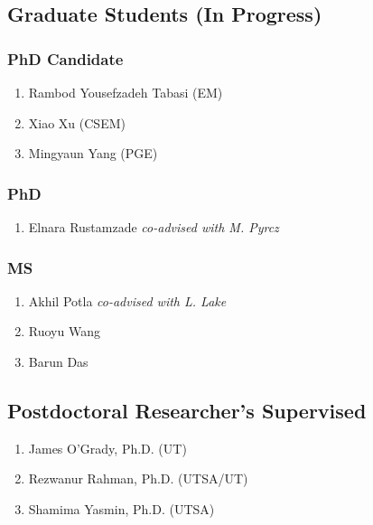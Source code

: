 \subsection*{Graduate Students (In Progress)}

\subsubsection*{PhD Candidate}
\begin{enumerate}
    \item Rambod Yousefzadeh Tabasi (EM)
    \item Xiao Xu (CSEM)
    \item Mingyaun Yang (PGE)
\end{enumerate}


\subsubsection*{PhD}
\begin{enumerate}
    \item Elnara Rustamzade \emph{co-advised with M. Pyrcz}
\end{enumerate}

\subsubsection*{MS}
\begin{enumerate}
    \item Akhil Potla \emph{co-advised with L. Lake}
    \item Ruoyu Wang 
    \item Barun Das
\end{enumerate}

\subsection*{Postdoctoral Researcher's Supervised}
  \begin{enumerate}
      \item James O'Grady, Ph.D. (UT)
      \item Rezwanur Rahman, Ph.D. (UTSA/UT)
      \item Shamima Yasmin, Ph.D. (UTSA)
  \end{enumerate}

